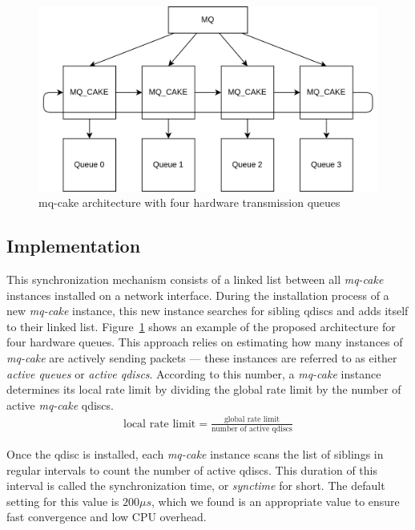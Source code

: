 \begin{figure}[h]
    \centering
    \includegraphics[scale=0.15]{images/mq_cake_architecture.drawio.png}
    \caption{mq-cake architecture with four hardware transmission queues}\label{fig:mq_cake_architecture}
\end{figure}

\subsection{Implementation}
This synchronization mechanism consists of a linked list between all \textit{mq-cake} instances installed on a network interface.
%
During the installation process of a new \textit{mq-cake} instance, this new instance searches for sibling qdiscs and adds itself to their linked list.
%
Figure~\ref{fig:mq_cake_architecture} shows an example of the proposed architecture for four hardware queues.
This approach relies on estimating how many instances of \textit{mq-cake} are actively sending packets --- these instances are referred to as either \textit{active queues} or \textit{active qdiscs}.
%
According to this number, a \textit{mq-cake} instance determines its local rate limit by dividing the global rate limit by the number of active \textit{mq-cake} qdiscs.
%
\begin{align}
    \text{local rate limit} = \frac{\text{global rate limit}}{\text{number of active qdiscs}}
\end{align} 

Once the qdisc is installed, each \textit{mq-cake} instance scans the list of siblings in regular intervals to count the number of active qdiscs. 
%
This duration of this interval is called the synchronization time, or \textit{synctime} for short.
%
%
%
The default setting for this value is $200\mu s$, which we found is an appropriate value to ensure fast convergence and low CPU overhead. 
%

